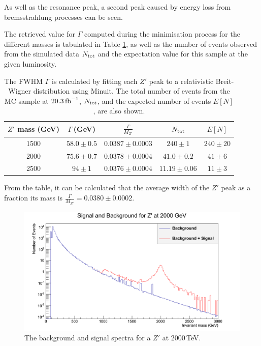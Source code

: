 \documentclass{article}
\begin{document}
As well as the resonance peak, a second peak caused by energy loss from bremsstrahlung processes can be seen. 

The retrieved value for $\Gamma$ computed during the minimisation process for the different masses is tabulated in Table \ref{table:resonanceWidth}, as well as the number of events observed from the simulated data $N_{\rm{tot}}$ and the expectation value for this sample at the given luminosity.

\begin{table}[h!t]
\centering
\caption{The FWHM $\Gamma$ is calculated by fitting each $Z'$ peak to a relativistic Breit-Wigner distribution using Minuit. The total number of events from the  MC sample at $20.3\,\rm{fb}^{-1}$, $N_{\rm{tot}}$, and the expected number of events $E[N]$, are also shown. \label{table:resonanceWidth}}
\begin{tabular}{ |c|c|c|c|c| } 
\hline
$Z'$ mass (GeV) & $\Gamma\,$(GeV) & $\frac{\Gamma}{M_{Z'}}$ & $N_{\rm{tot}}$ & $E[N]$\\
\hline
1500 & $58.0\pm0.5$ & $0.0387\pm0.0003$ & $240\pm1$			& $240\pm20$\\
2000 & $75.6\pm0.7$ & $0.0378\pm0.0004$ & $41.0\pm0.2$		& $41\pm6$\\
2500 & $94\pm1$ & $0.0376\pm0.0004$ 	& $11.19\pm0.06$	& $11\pm3$\\
\hline
\end{tabular}
\end{table}

From the table, it can be calculated that the average width of the $Z'$ peak as a fraction its mass is $\frac{\Gamma}{M_{Z'}} = 0.0380\pm0.0002$.

\begin{figure}[h]
    \centering
    \includegraphics[scale=0.3]{images/backgroundSignal.png}
    \caption{ The background and signal spectra for a $Z'$ at $2000\,$TeV. \label{fig:backgroundSignal}}
\end{figure}
\end{document}
